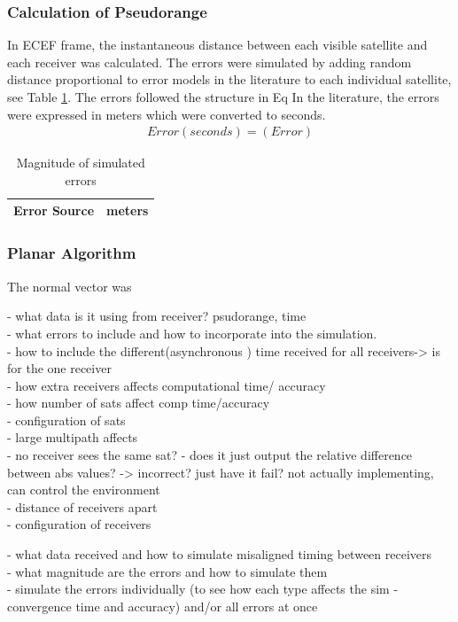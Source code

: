 \subsubsection{Calculation of Pseudorange}
In ECEF frame, the instantaneous distance between each visible satellite and each receiver was calculated. The errors were simulated by adding random distance proportional to error models in the literature to each individual satellite, see Table \ref{Table:mag errors}. The errors followed the structure in Eq
In the literature, the errors were expressed in meters which were converted to seconds.
\begin{eqnarray}
Error(seconds) = (Error)
\end{eqnarray}
\begin{table}
\centering
\caption{Magnitude of simulated errors}
\label{Table:mag errors}
\begin{tabular}{|c|c|}
\hline
Error Source & meters \\\hline
\end{tabular}
\end{table}

\subsubsection{Planar Algorithm}
The normal vector was


- what data is it using from receiver? psudorange, time\\

- what errors to include and how to incorporate into the simulation.\\
- how to include the different(asynchronous ) time received for all receivers-> is for the one receiver \\
- how extra receivers affects computational time/ accuracy\\
- how number of sats affect comp time/accuracy\\
- configuration of sats\\
- large multipath affects\\
- no receiver sees the same sat? - does it just output the relative difference between abs values? -> incorrect? just have it fail? not actually implementing, can control the environment\\
- distance of receivers apart\\
- configuration of receivers


- what data received and how to simulate misaligned timing between receivers\\
- what magnitude are the errors and how to simulate them\\
- simulate the errors individually (to see how each type affects the sim - convergence time and accuracy) and/or all errors at once


